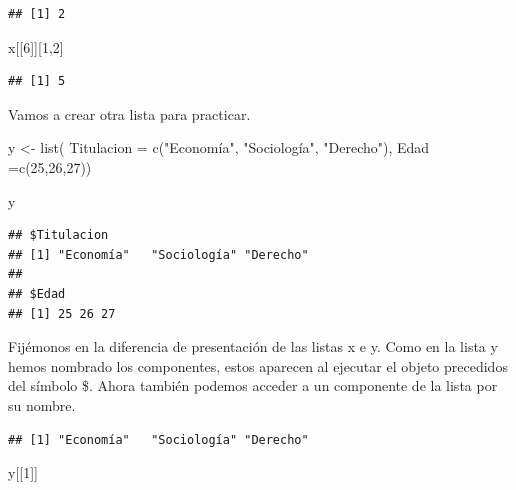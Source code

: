 \documentclass[
]{book}
\newenvironment{Shaded}{\begin{snugshade}}{\end{snugshade}}
\newcommand{\AttributeTok}[1]{\textcolor[rgb]{0.77,0.63,0.00}{#1}}
\newcommand{\DecValTok}[1]{\textcolor[rgb]{0.00,0.00,0.81}{#1}}
\newcommand{\FunctionTok}[1]{\textcolor[rgb]{0.00,0.00,0.00}{#1}}
\newcommand{\NormalTok}[1]{#1}
\newcommand{\OtherTok}[1]{\textcolor[rgb]{0.56,0.35,0.01}{#1}}
\newcommand{\SpecialCharTok}[1]{\textcolor[rgb]{0.00,0.00,0.00}{#1}}
\newcommand{\StringTok}[1]{\textcolor[rgb]{0.31,0.60,0.02}{#1}}
\begin{document}
\begin{verbatim}
## [1] 2
\end{verbatim}

\begin{Shaded}
\begin{Highlighting}[]
\NormalTok{x[[}\DecValTok{6}\NormalTok{]][}\DecValTok{1}\NormalTok{,}\DecValTok{2}\NormalTok{]}
\end{Highlighting}
\end{Shaded}

\begin{verbatim}
## [1] 5
\end{verbatim}

Vamos a crear otra lista para practicar.

\begin{Shaded}
\begin{Highlighting}[]
\NormalTok{y }\OtherTok{\textless{}{-}} \FunctionTok{list}\NormalTok{( }\AttributeTok{Titulacion =} \FunctionTok{c}\NormalTok{(}\StringTok{"Economía"}\NormalTok{, }\StringTok{"Sociología"}\NormalTok{, }\StringTok{"Derecho"}\NormalTok{), }\AttributeTok{Edad =}\FunctionTok{c}\NormalTok{(}\DecValTok{25}\NormalTok{,}\DecValTok{26}\NormalTok{,}\DecValTok{27}\NormalTok{))}

\NormalTok{y}
\end{Highlighting}
\end{Shaded}

\begin{verbatim}
## $Titulacion
## [1] "Economía"   "Sociología" "Derecho"   
## 
## $Edad
## [1] 25 26 27
\end{verbatim}

Fijémonos en la diferencia de presentación de las listas x e y. Como en la lista y hemos nombrado los componentes, estos aparecen al ejecutar el objeto precedidos del símbolo \$. Ahora también podemos acceder a un componente de la lista por su nombre.

\begin{Shaded}
\end{Shaded}

\begin{verbatim}
## [1] "Economía"   "Sociología" "Derecho"
\end{verbatim}

\begin{Shaded}
\begin{Highlighting}[]
\NormalTok{y[[}\DecValTok{1}\NormalTok{]]}
\end{Highlighting}
\end{Shaded}
\end{document}
